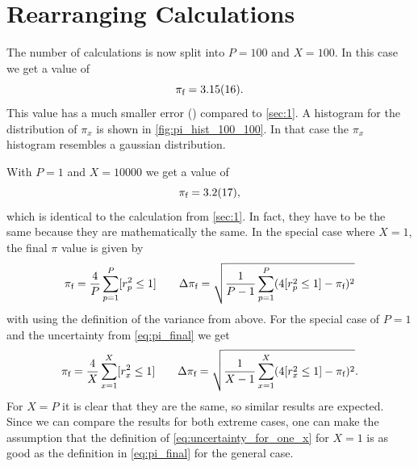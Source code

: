 \section{Rearranging Calculations}\label{sec:2}
The number of calculations is now split into $P = \num{100}$ and
$X = \num{100}$. In this case we get a value of
\begin{equation}
	\final = \num{3.15 \pm 0.16}.
\end{equation}
This value has a much smaller error () compared to \cref{sec:1}. A histogram 
for the distribution of $\pi_x$ is shown in \cref{fig:pi_hist_100_100}.
In that case the $\pi_x$ histogram resembles a gaussian distribution.\par
%
With $P=1$ and $X = \num{10000}$ we get a value of 
\begin{equation}
    \final = \num{3.2\pm 1.7},
\end{equation}
which is identical to the calculation from \cref{sec:1}. In fact, they have to be 
the same because they are mathematically the same. In the special case where 
$X = 1$, the final $\pi$ value is given by 
\[
	\final = \frac{4}{P}\sum_{p=1}^P\iv{r_p^2 \leq 1} \qquad 
	\Delta \final = \sqrt{\frac{1}{P-1}\sum_{p=1}^P(4\iv{r_p^2 \leq 1} - \final)^2}
\]
with using the definition of the variance from above. For the special case 
of $P = 1$ and the uncertainty from \cref{eq:pi_final} we get 
\[
	\final = \frac{4}{X}\sum_{x=1}^X \iv{r_x^2\leq 1} \qquad 
	\Delta \final = \sqrt{\frac{1}{X - 1}\sum_{x=1}^X (4\iv{r_x^2 \leq 1} - \final)^2}.
\]
For $X = P$ it is clear that they are the same, so similar results are expected. 
Since we can compare the results for both extreme cases, one can make the assumption that 
the definition of \cref{eq:uncertainty_for_one_x} for $X=1$ is as good as 
the definition in \ref{eq:pi_final} for the general case.

